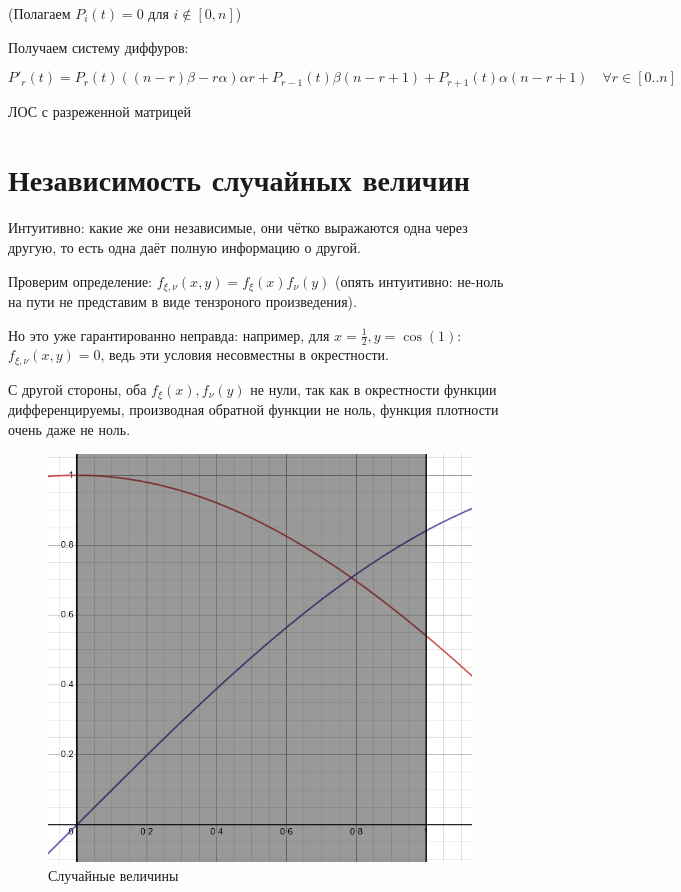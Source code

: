 \documentclass[12pt, a4paper]{article}
\begin{document}
(Полагаем $P_i(t) = 0$ для $i \notin [0, n]$)

Получаем систему диффуров:

\begin{equation}
  P'_r(t) = P_r(t)((n - r)\beta - r \alpha) \alpha r + P_{r - 1}(t) \beta (n - r + 1) + P_{r + 1}(t) \alpha (n - r + 1) \quad \forall r \in [0..n]
\end{equation}

ЛОС с разреженной матрицей




\section{Независимость случайных величин}

Интуитивно: какие же они независимые, они чётко выражаются одна через другую,
то есть одна даёт полную информацию о другой.

Проверим определение: $f_{\xi, \nu}(x, y) = f_\xi(x)f_\nu(y)$ (опять интуитивно: не-ноль на пути не представим в виде тензроного произведения).

Но это уже гарантированно неправда: например, для $x = \frac{1}{2}, y = \cos(1)$:
$f_{\xi, \nu}(x, y) = 0$, ведь эти условия несовместны в окрестности.

С другой стороны, оба $f_\xi(x), f_\nu(y)$ не нули, так как в окрестности 
функции дифференцируемы, производная обратной функции не ноль, функция плотности очень даже не ноль.

\begin{figure}[h!]
  \centering
  \includegraphics[width=0.5\paperwidth]{res/5.png}
  \caption{Случайные величины}
  \label{fig:counterexample}
\end{figure}
\FloatBarrier
\end{document}
